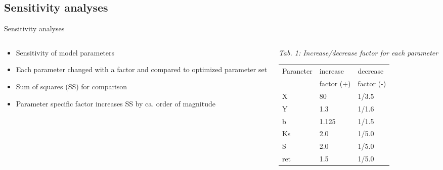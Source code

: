 
\subsection{Sensitivity analyses}
\begin{block}{Sensitivity analyses}
\justifying
\begin{columns}
        \begin{column}{0.25\textwidth}
            \begin{itemize}
                \item Sensitivity of model parameters 
                \item Each parameter changed with a factor and compared to optimized parameter set
                \item Sum of squares (SS) for comparison
                \item Parameter specific factor increases SS by ca. order of magnitude
            \end{itemize}
        \end{column}
    \begin{column}{0.25\textwidth}
            \justifying
            {\it Tab. 1: Increase/decrease factor for each parameter}
        \begin{table}[]
            \small
            \begin{tabular}{lll}
                \hline
                \hline
                Paraneter & increase   & decrease \\
                          & factor (+) & factor (-) \\
                \hline
                X         & 80                  & 1/3.5               \\
                Y         & 1.3                 & 1/1.6               \\
                b         & 1.125               & 1/1.5               \\
                Ks        & 2.0                 & 1/5.0               \\
                S         & 2.0                 & 1/5.0               \\
                ret       & 1.5                 & 1/5.0              \\
                \hline
                \hline
            \end{tabular}

\end{table}
\end{column}
\end{columns}
\end{block}
